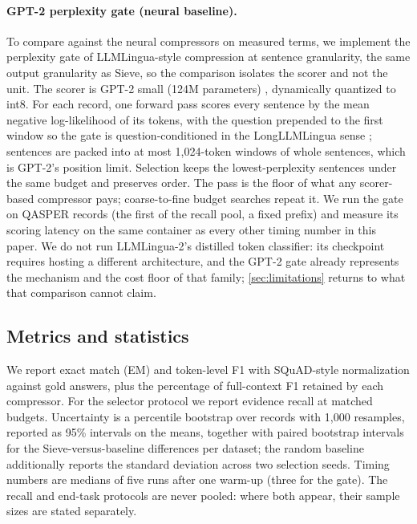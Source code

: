 \documentclass[preprint,12pt]{elsarticle}
\theoremstyle{remark}
\newcommand{\method}{Sieve}
\begin{document}
\paragraph{GPT-2 perplexity gate (neural baseline).}
To compare against the neural compressors on measured terms, we
implement the perplexity gate of LLMLingua-style compression
\citep{jiang2023llmlingua} at sentence granularity, the same output
granularity as \method{}, so the comparison isolates the scorer and
not the unit. The scorer is GPT-2 small (124M parameters)
\citep{radford2019gpt2}, dynamically quantized to int8. For each
record, one forward pass scores every sentence by the mean negative
log-likelihood of its tokens, with the question prepended to the
first window so the gate is question-conditioned in the LongLLMLingua
sense \citep{jiang2023longllmlingua}; sentences are packed into at
most 1{,}024-token windows of whole sentences, which is GPT-2's
position limit. Selection keeps the lowest-perplexity sentences under
the same budget and preserves order. The pass is the floor of what
any scorer-based compressor pays; coarse-to-fine budget searches
repeat it. We run the gate on \GateN{} QASPER records (the first
\GateN{} of the recall pool, a fixed prefix) and measure its scoring
latency on the same container as every other timing number in this
paper. We do not run LLMLingua-2's distilled token classifier: its
checkpoint requires hosting a different architecture, and the GPT-2
gate already represents the mechanism and the cost floor of that
family; \autoref{sec:limitations} returns to what that comparison
cannot claim.

\subsection{Metrics and statistics}
We report exact match (EM) and token-level F1 with SQuAD-style
normalization \citep{yang2018hotpotqa} against gold answers, plus the
percentage of full-context F1 retained by each compressor. For the
selector protocol we report evidence recall at matched budgets.
Uncertainty is a percentile bootstrap over records with 1{,}000
resamples, reported as 95\% intervals on the means, together with
paired bootstrap intervals for the \method{}-versus-baseline
differences per dataset; the random baseline additionally reports the
standard deviation across two selection seeds. Timing numbers are
medians of five runs after one warm-up (three for the gate). The
recall and end-task protocols are never pooled: where both appear,
their sample sizes are stated separately.
\end{document}

